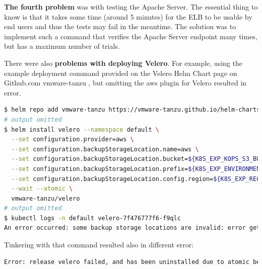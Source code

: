 \textbf{The fourth problem} was with testing the Apache Server. The essential thing to know is that it takes some time (around 5 minutes) for the ELB to be usable by end users and thus the tests may fail in the meantime. The solution was to implement such a command that verifies the Apache Server endpoint many times, but has a maximum number of trials.

There were also \textbf{problems with deploying Velero}. For example, using the example deployment command provided on the Velero Helm Chart page on Github.com vmware-tanzu \cite{velero-helm-chart}, but omitting the aws plugin for Velero resulted in error.

\begin{lstlisting}[basicstyle=\tiny,caption={Installing Velero server},captionpos=b,language=Bash,xleftmargin=1cm]
$ helm repo add vmware-tanzu https://vmware-tanzu.github.io/helm-charts
# output omitted
$ helm install velero --namespace default \
  --set configuration.provider=aws \
  --set configuration.backupStorageLocation.name=aws \
  --set configuration.backupStorageLocation.bucket=${K8S_EXP_KOPS_S3_BUCKET} \
  --set configuration.backupStorageLocation.prefix=${K8S_EXP_ENVIRONMENT} \
  --set configuration.backupStorageLocation.config.region=${K8S_EXP_REGION} \
  --wait --atomic \
  vmware-tanzu/velero
# output omitted
$ kubectl logs -n default velero-7f476777f6-f9qlc
An error occurred: some backup storage locations are invalid: error getting backup store for location "aws": unable to locate ObjectStore plugin named velero.io/aws
\end{lstlisting}

Tinkering with that command resulted also in different error:
\begin{lstlisting}[basicstyle=\tiny,caption={Velero server installation error},captionpos=b,language=Bash,xleftmargin=1cm]
Error: release velero failed, and has been uninstalled due to atomic being set: timed out waiting for the condition
\end{lstlisting}

